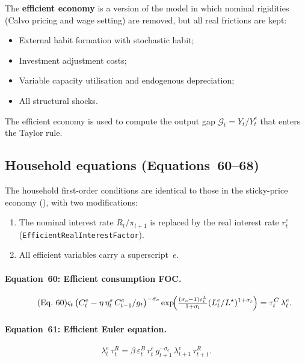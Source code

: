 \documentclass[11pt,a4paper]{article}
\begin{document}
The \textbf{efficient economy} is a version of the model in which nominal
rigidities (Calvo pricing and wage setting) are removed, but all real
frictions are kept:
\begin{itemize}[nosep]
  \item External habit formation with stochastic habit;
  \item Investment adjustment costs;
  \item Variable capacity utilisation and endogenous depreciation;
  \item All structural shocks.
\end{itemize}
The efficient economy is used to compute the output gap
$\mathcal{G}_t = Y_t/Y^e_t$ that enters the Taylor rule.

\subsection{Household equations (Equations~60--68)}

The household first-order conditions are identical to those in the sticky-price
economy (), with two modifications:
\begin{enumerate}[nosep]
  \item The nominal interest rate $R_t/\pi_{t+1}$ is replaced by the real
    interest rate $r^e_t$ (\texttt{EfficientRealInterestFactor}).
  \item All efficient variables carry a superscript~$e$.
\end{enumerate}

\paragraph{Equation~60: Efficient consumption FOC.}
\begin{equation}\tag{Eq.~60}
  \varsigma_t\,\bigl(C^e_t - \eta\,\eta^s_t\,C^e_{t-1}/g_t\bigr)^{-\sigma_c}
  \exp\!\Bigl(\tfrac{(\sigma_c-1)\varepsilon^L_t}{1+\sigma_l}
  (L^e_t/L^{\star})^{1+\sigma_l}\Bigr)
  = \tau^C_t\,\lambda^e_t.
\end{equation}

\paragraph{Equation~61: Efficient Euler equation.}
\begin{equation}\tag{Eq.~61}
  \lambda^e_t\,\tau^R_t
  = \beta\,\varepsilon^B_t\,r^e_t\,g_{t+1}^{-\sigma_c}\,
    \lambda^e_{t+1}\,\tau^R_{t+1}.
\end{equation}
\end{document}
